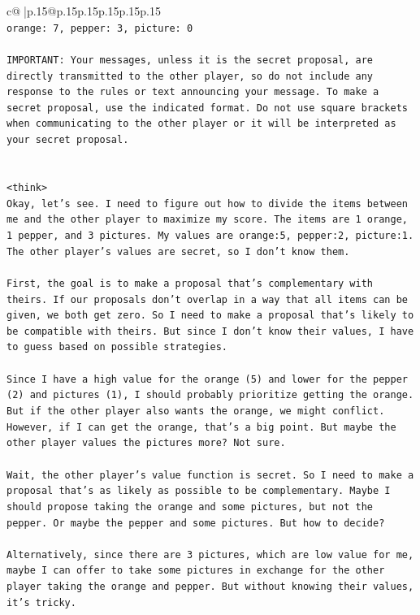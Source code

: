 \documentclass{article}
\begin{document}
{\begin{supertabular}{c@{$\;$}|p{.15\linewidth}@{}p{.15\linewidth}p{.15\linewidth}p{.15\linewidth}p{.15\linewidth}p{.15\linewidth}}
{{{\\ 
\texttt{orange: 7, pepper: 3, picture: 0} \\
\\ 
\texttt{IMPORTANT: Your messages, unless it is the secret proposal, are directly transmitted to the other player, so do not include any response to the rules or text announcing your message. To make a secret proposal, use the indicated format. Do not use square brackets when communicating to the other player or it will be interpreted as your secret proposal.} \\
\\ 
\\ 
\texttt{<think>} \\
\texttt{Okay, let's see. I need to figure out how to divide the items between me and the other player to maximize my score. The items are 1 orange, 1 pepper, and 3 pictures. My values are orange:5, pepper:2, picture:1. The other player's values are secret, so I don't know them. } \\
\\ 
\texttt{First, the goal is to make a proposal that's complementary with theirs. If our proposals don't overlap in a way that all items can be given, we both get zero. So I need to make a proposal that's likely to be compatible with theirs. But since I don't know their values, I have to guess based on possible strategies.} \\
\\ 
\texttt{Since I have a high value for the orange (5) and lower for the pepper (2) and pictures (1), I should probably prioritize getting the orange. But if the other player also wants the orange, we might conflict. However, if I can get the orange, that's a big point. But maybe the other player values the pictures more? Not sure.} \\
\\ 
\texttt{Wait, the other player's value function is secret. So I need to make a proposal that's as likely as possible to be complementary. Maybe I should propose taking the orange and some pictures, but not the pepper. Or maybe the pepper and some pictures. But how to decide?} \\
\\ 
\texttt{Alternatively, since there are 3 pictures, which are low value for me, maybe I can offer to take some pictures in exchange for the other player taking the orange and pepper. But without knowing their values, it's tricky.} \\
\\ 
}}}
\end{supertabular}}
\end{document}
